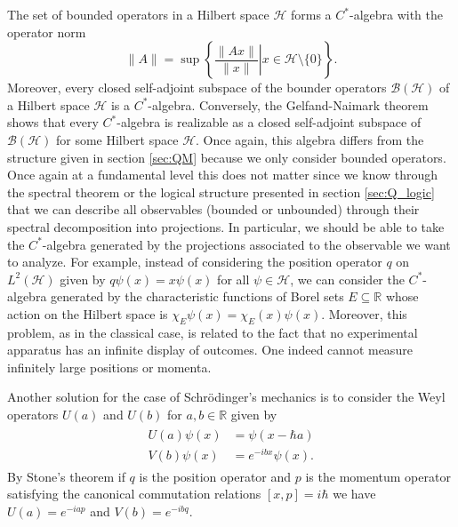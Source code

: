 \begin{example}
The set of bounded operators in a Hilbert space $\mathcal{H}$ forms a $C^*$-algebra with the operator norm
\begin{equation}
\|A\|=\sup\left\{\left.\frac{\|Ax\|}{\|x\|}\right|x\in\mathcal{H}\setminus \{0\} \right\}.
\end{equation}
Moreover, every closed self-adjoint subspace of the bounder operators $\mathcal{B}(\mathcal{H})$ of a Hilbert space $\mathcal{H}$ is a $C^*$-algebra. Conversely, the Gelfand-Naimark theorem shows that every $C^*$-algebra is realizable as a closed self-adjoint subspace of $\mathcal{B}(\mathcal{H})$ for some Hilbert space $\mathcal{H}$\cite{Bratteli1997}. Once again, this algebra differs from the structure given in section \ref{sec:QM} because we only consider bounded operators. Once again at a fundamental level this does not matter since we know through the spectral theorem or the logical structure presented in section \ref{sec:Q_logic} that we can describe all observables (bounded or unbounded) through their spectral decomposition into projections. In particular, we should be able to take the $C^*$-algebra generated by the projections associated to the observable we want to analyze. For example, instead of considering the position operator $q$ on $L^2(\mathcal{H})$ given by $q\psi(x)=x\psi(x)$ for all $\psi\in\mathcal{H}$, we can consider the $C^*$-algebra generated by the characteristic functions of Borel sets $E\subseteq\mathbb{R}$ whose action on the Hilbert space is $\chi_E\psi(x) = \chi_E(x)\psi(x)$. Moreover, this problem, as in the classical case, is related to the fact that no experimental apparatus has an infinite display of outcomes. One indeed cannot measure infinitely large positions or momenta.

Another solution for the case of Schrödinger's mechanics is to consider the Weyl operators $U(a)$ and $U(b)$ for $a,b\in\mathbb{R}$ given by
\begin{align}
\begin{split}
U(a)\psi(x) &= \psi(x-\hbar a) \\
V(b)\psi(x) &= e^{-ibx}\psi(x).
\end{split} 
\end{align}
By Stone's theorem if $q$ is the position operator and $p$ is the momentum operator satisfying the canonical commutation relations $[x,p]=i\hbar$ we have $U(a)=e^{-iap}$ and $V(b)=e^{-ibq}$\cite{Strocchi2008a}. 
\end{example}

